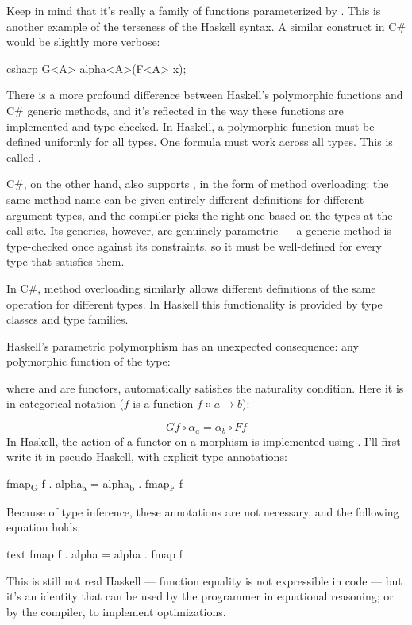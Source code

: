 Keep in mind that it's really a family of functions parameterized by
. This is another example of the terseness of the Haskell
syntax. A similar construct in C\# would be slightly more verbose:

\begin{snip}{csharp}
G<A> alpha<A>(F<A> x);
\end{snip}
There is a more profound difference between Haskell's polymorphic
functions and C\# generic methods, and it's reflected in the way these
functions are implemented and type-checked. In Haskell, a polymorphic
function must be defined uniformly for all types. One formula must work
across all types. This is called .

C\#, on the other hand, also supports , in
the form of method overloading: the same method name can be given
entirely different definitions for different argument types, and the
compiler picks the right one based on the types at the call site. Its
generics, however, are genuinely parametric --- a generic method is
type-checked once against its constraints, so it must be well-defined for
every type that satisfies them.

In C\#, method overloading similarly allows different definitions of the
same operation for different types. In Haskell this functionality is
provided by type classes and type families.

Haskell's parametric polymorphism has an unexpected consequence: any
polymorphic function of the type:

where  and  are functors, automatically satisfies
the naturality condition. Here it is in categorical notation ($f$
is a function $f \Colon a \to b$):

\[G f \circ \alpha_a = \alpha_b \circ F f\]
In Haskell, the action of a functor  on a morphism 
is implemented using . I'll first write it in
pseudo-Haskell, with explicit type annotations:

\begin{snipv}
fmap\textsubscript{G} f . alpha\textsubscript{a} = alpha\textsubscript{b} . fmap\textsubscript{F} f
\end{snipv}
Because of type inference, these annotations are not necessary, and the
following equation holds:

\begin{snip}{text}
fmap f . alpha = alpha . fmap f
\end{snip}
This is still not real Haskell --- function equality is not expressible
in code --- but it's an identity that can be used by the programmer in
equational reasoning; or by the compiler, to implement optimizations.

